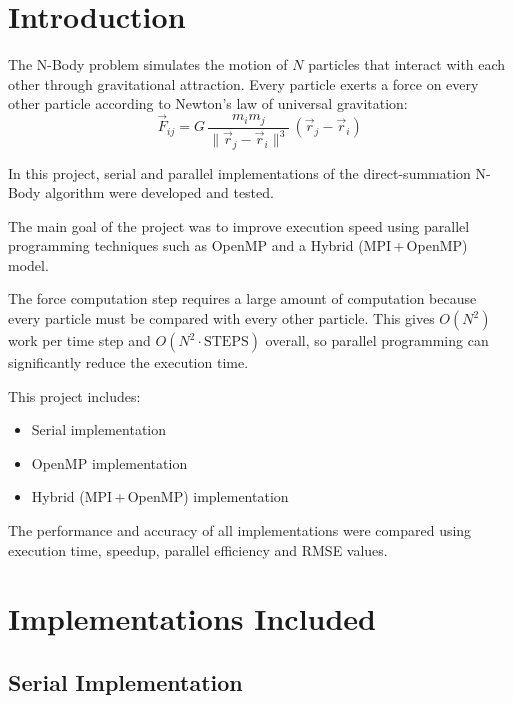\documentclass[11pt,a4paper]{article}
\begin{document}
\tableofcontents
\newpage

\section{Introduction}

The N-Body problem simulates the motion of $N$ particles that interact with
each other through gravitational attraction. Every particle exerts a force on
every other particle according to Newton's law of universal gravitation:
\begin{equation}
\vec{F}_{ij} = G\,\frac{m_i m_j}{\lVert \vec{r}_j - \vec{r}_i \rVert^{3}}\,
               (\vec{r}_j - \vec{r}_i)
\end{equation}

In this project, serial and parallel implementations of the direct-summation
N-Body algorithm were developed and tested.

The main goal of the project was to improve execution speed using parallel
programming techniques such as OpenMP and a Hybrid (MPI\,+\,OpenMP) model.

The force computation step requires a large amount of computation because
every particle must be compared with every other particle. This gives
$O(N^2)$ work per time step and $O(N^2 \cdot \text{STEPS})$ overall, so
parallel programming can significantly reduce the execution time.

This project includes:
\begin{itemize}
  \item Serial implementation
  \item OpenMP implementation
  \item Hybrid (MPI\,+\,OpenMP) implementation
\end{itemize}

The performance and accuracy of all implementations were compared using
execution time, speedup, parallel efficiency and RMSE values.

\section{Implementations Included}

\subsection{Serial Implementation}
\end{document}
